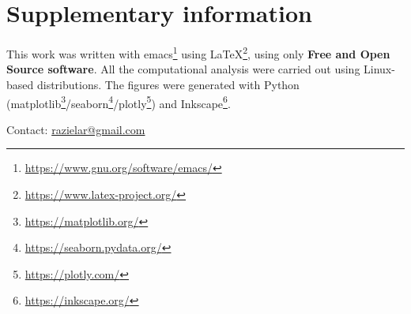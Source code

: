 \section[Supplementary information]{Supplementary information}
\label{sec:supp_info}

This work was written with emacs\footnote{\url{https://www.gnu.org/software/emacs/}} using  \LaTeX\/\footnote{\url{https://www.latex-project.org/}}, using only \textbf{Free and Open Source software}. 
All the computational analysis were carried out using Linux-based distributions. The figures were generated with Python (matplotlib\footnote{\url{https://matplotlib.org/}}/seaborn\footnote{\url{https://seaborn.pydata.org/}}/plotly\footnote{\url{https://plotly.com/}}) and Inkscape\footnote{\url{https://inkscape.org/}}.

\begin{center}
Contact: \href{mailto:razielar@gmail.com}{razielar@gmail.com}
\end{center}

